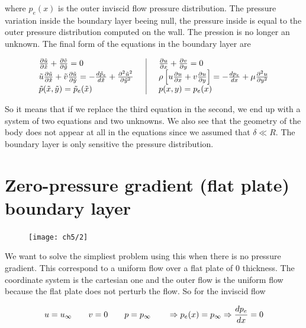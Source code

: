 	where $p_e(x)$ is the outer inviscid flow pressure distribution. The pressure variation inside the boundary layer beeing null, the pressure inside is equal to the outer pressure distribution computed on the wall. The pression is no longer an unknown. The final form of the equations in the boundary layer are 

	\begin{equation}
	\begin{array}{l|l}
		\frac{\partial \tilde{u}}{\partial \tilde{x}} + \frac{\partial \tilde{v}}{\partial \tilde{y}} = 0	 & 	\quad\frac{\partial u}{\partial x} + \frac{\partial v}{\partial y} = 0\\
	 		\tilde{u} \frac{\partial \tilde{u}}{\partial \tilde{x}} +  \tilde{v} \frac{\partial \tilde{u}}{\partial \tilde{y}} = -\frac{d \tilde{p}_e}{d \tilde{x}}	+ \frac{\partial ^2 \tilde{u}^2}{\partial \tilde{y}^2}\quad & 	\quad	 \rho \left[ u \frac{\partial u}{\partial x} + v \frac{\partial u}{\partial y} \right] = -\frac{d p_e}{d x} + \mu \frac{\partial ^2 u}{\partial y^2}\\
	 		\tilde{p}(\tilde{x}, \tilde{y}) = \tilde{p}_e (\tilde{x}) 	&\quad p(x,y) = p_e(x) 
	\end{array}
	\end{equation}
	
	So it means that if we replace the third equation in the second, we end up with a system of two equations and two unknowns. We also see that the geometry of the body does not appear at all in the equations since we assumed that $\delta \ll R$. The boundary layer is only sensitive the pressure distribution.
	

\section{Zero-pressure gradient (flat plate) boundary layer}
	\begin{figure}
	\vspace{0mm}
	\texttt{[image: ch5/2]}
	\end{figure}
	We want to solve the simpliest problem using this when there is no pressure gradient. This correspond to a uniform flow over a flat plate of 0 thickness. The coordinate system is the cartesian one and the outer flow is the uniform flow because the flat plate does not perturb the flow. So for the inviscid flow 
	
	\begin{equation}
		u = u_\infty \qquad v = 0 \qquad p = p_\infty \qquad \Rightarrow p_e(x) = p_\infty \Rightarrow \frac{dp_e}{dx} = 0
	\end{equation}
	
